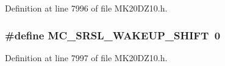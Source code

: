 Definition at line 7996 of file M\+K20\+D\+Z10.\+h.

\subsubsection[{\texorpdfstring{M\+C\+\_\+\+S\+R\+S\+L\+\_\+\+W\+A\+K\+E\+U\+P\+\_\+\+S\+H\+I\+FT}{MC_SRSL_WAKEUP_SHIFT}}]{\setlength{\rightskip}{0pt plus 5cm}\#define M\+C\+\_\+\+S\+R\+S\+L\+\_\+\+W\+A\+K\+E\+U\+P\+\_\+\+S\+H\+I\+FT~0}\hypertarget{group___m_c___register___masks_ga944f90f0cbd5d3480524ca17bfa0b9e2}{}\label{group___m_c___register___masks_ga944f90f0cbd5d3480524ca17bfa0b9e2}


Definition at line 7997 of file M\+K20\+D\+Z10.\+h.

